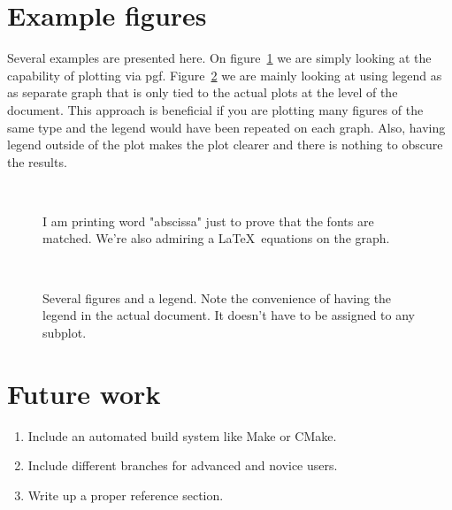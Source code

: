 \documentclass[a4paper,12pt]{article}
\begin{document}
\section{Example figures}

Several examples are presented here. On figure~\ref{fig:latex} we are simply
looking at the capability of plotting via pgf. Figure~\ref{fig:several} we are
mainly looking at using legend as as separate graph that is only tied to the
actual plots at the level of the document. This approach is beneficial if you
are plotting many figures of the same type and the legend would have been
repeated on each graph. Also, having legend outside of the plot makes the plot
clearer and there is nothing to obscure the results.


\begin{figure}[b] 
  \centering
   
  \\
  \caption{I am printing word "abscissa" just to prove that the fonts are
  matched. We're also admiring a \LaTeX\ equations on the graph.}
  \label{fig:latex} 
\end{figure}
\begin{figure}[b] 
  \centering
   
   
   
  \\
   
  \caption{Several figures and a legend. Note the convenience of having the
  legend in the actual document. It doesn't have to be assigned to any subplot.}
  \label{fig:several} 
\end{figure}

\section{Future work}
\begin{enumerate}
  \item Include an automated build system like Make or CMake.
  \item Include different branches for advanced and novice users.
  \item Write up a proper reference section.
\end{enumerate}
\end{document}
